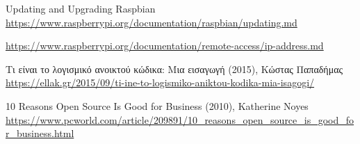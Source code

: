 \begin{thebibliography}{99}
Updating and Upgrading Raspbian
\url{https://www.raspberrypi.org/documentation/raspbian/updating.md}

\url{https://www.raspberrypi.org/documentation/remote-access/ip-address.md}

Τι είναι το λογισμικό ανοικτού κώδικα: Μια εισαγωγή (2015), Κώστας Παπαδήμας\\
\url{https://ellak.gr/2015/09/ti-ine-to-logismiko-aniktou-kodika-mia-isagogi/}

10 Reasons Open Source Is Good for Business (2010), Katherine Noyes\\
\url{https://www.pcworld.com/article/209891/10_reasons_open_source_is_good_for_business.html}


\end{thebibliography}